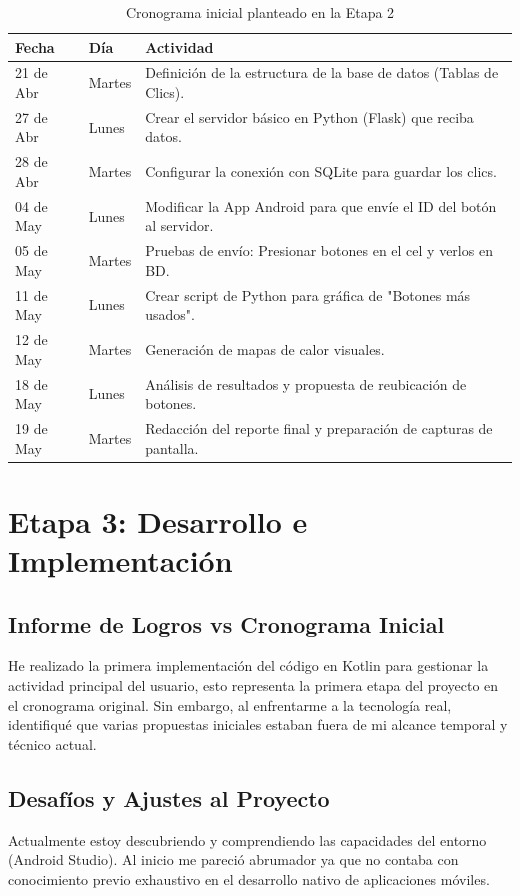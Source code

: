 \documentclass[final,3p,times]{elsarticle}
\begin{document}
\begin{table}[H]
    \centering
    \caption{Cronograma inicial planteado en la Etapa 2}
    \begin{tabularx}{\textwidth}{llX}
        \toprule
        \textbf{Fecha} & \textbf{Día} & \textbf{Actividad} \\
        \midrule
        21 de Abr & Martes & Definición de la estructura de la base de datos (Tablas de Clics). \\
        27 de Abr & Lunes & Crear el servidor básico en Python (Flask) que reciba datos. \\
        28 de Abr & Martes & Configurar la conexión con SQLite para guardar los clics. \\
        04 de May & Lunes & Modificar la App Android para que envíe el ID del botón al servidor. \\
        05 de May & Martes & Pruebas de envío: Presionar botones en el cel y verlos en BD. \\
        11 de May & Lunes & Crear script de Python para gráfica de "Botones más usados". \\
        12 de May & Martes & Generación de mapas de calor visuales. \\
        18 de May & Lunes & Análisis de resultados y propuesta de reubicación de botones. \\
        19 de May & Martes & Redacción del reporte final y preparación de capturas de pantalla. \\
        \bottomrule
    \end{tabularx}
\end{table}

\section{Etapa 3: Desarrollo e Implementación}

\subsection{Informe de Logros vs Cronograma Inicial}
He realizado la primera implementación del código en Kotlin para gestionar la actividad principal del usuario, esto representa la primera etapa del proyecto en el cronograma original. Sin embargo, al enfrentarme a la tecnología real, identifiqué que varias propuestas iniciales estaban fuera de mi alcance temporal y técnico actual. 

\subsection{Desafíos y Ajustes al Proyecto}
Actualmente estoy descubriendo y comprendiendo las capacidades del entorno (Android Studio). Al inicio me pareció abrumador ya que no contaba con conocimiento previo exhaustivo en el desarrollo nativo de aplicaciones móviles. 
\end{document}
